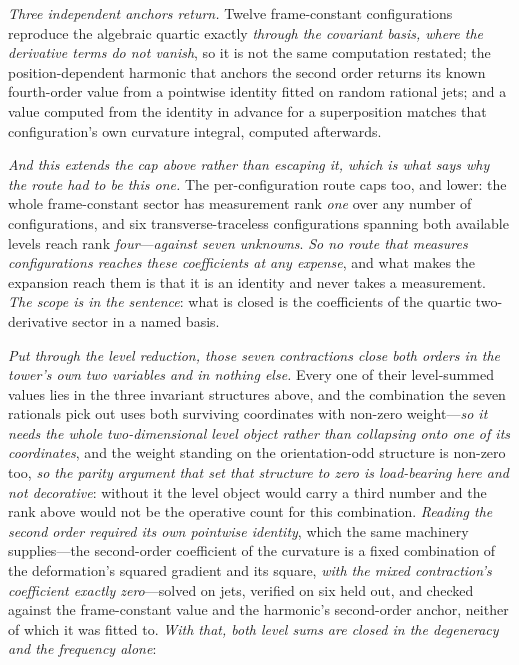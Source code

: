 \documentclass[11pt,a4paper]{article}
\theoremstyle{plain}
\theoremstyle{definition}
\theoremstyle{remark}
\begin{document}
\noindent\emph{Three independent anchors return.} Twelve frame-constant configurations reproduce the algebraic
quartic exactly \emph{through the covariant basis, where the derivative terms do not vanish}, so it is not the
same computation restated; the position-dependent harmonic that anchors the second order returns its known
fourth-order value from a pointwise identity fitted on random rational jets; and a value computed from the
identity in advance for a superposition matches that configuration's own curvature integral, computed afterwards.

\emph{And this extends the cap above rather than escaping it, which is what says why the route had to be this
one.} The per-configuration route caps too, and lower: the whole frame-constant sector has measurement rank
\emph{one} over any number of configurations, and six transverse-traceless configurations spanning both
available levels reach rank \emph{four}---\emph{against seven unknowns}. \emph{So no route that measures
configurations reaches these coefficients at any expense}, and what makes the expansion reach them is that it is
an identity and never takes a measurement. \emph{The scope is in the sentence}: what is closed is the
coefficients of the quartic two-derivative sector in a named
basis.

\emph{Put through the level reduction, those seven contractions close both orders in the tower's own two
variables and in nothing else.} Every one of their level-summed values lies in the three invariant structures
above, and the combination the seven rationals pick out uses both surviving coordinates with non-zero
weight---\emph{so it needs the whole two-dimensional level object rather than collapsing onto one of its
coordinates}, and the weight standing on the orientation-odd structure is non-zero too, \emph{so the parity
argument that set that structure to zero is load-bearing here and not decorative}: without it the level object
would carry a third number and the rank above would not be the operative count for this combination.
\emph{Reading the second order required its own pointwise identity}, which the same machinery supplies---the
second-order coefficient of the curvature is a fixed combination of the deformation's squared gradient and its
square, \emph{with the mixed contraction's coefficient exactly zero}---solved on jets, verified on six held
out, and checked against the frame-constant value and the harmonic's second-order anchor, neither of which it
was fitted to. \emph{With that, both level sums are closed in the degeneracy and the frequency alone}:
\end{document}

